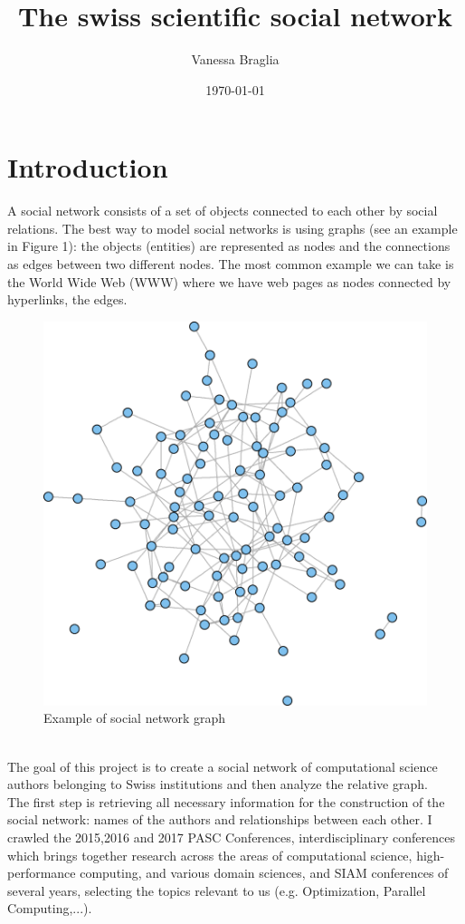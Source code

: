 \documentclass[12 pt]{article}
\author{Vanessa Braglia}
\title{The swiss scientific social network}
\date{\today}
\begin{document}
\selectfont
\maketitle 
\newpage
\tableofcontents
\newpage
\section{Introduction}
A social network consists of a set of objects connected to each other by social relations. The best way to model social networks is using graphs (see an example in Figure 1): the objects (entities) are represented as nodes and the connections as edges between two different nodes. The most common example we can take is the World Wide Web (WWW) where we have web pages as nodes connected by hyperlinks, the edges.\\
\begin{figure} [h!]
\centering 
\includegraphics[scale=0.5]{./img/graph.png}
\caption{Example of social network graph}
\end{figure}
\\
The goal of this project is to create a social network of computational science authors belonging to Swiss institutions and then analyze the relative graph.\\
The first step is retrieving all necessary information for the construction of the social network: names of the authors and relationships between each other. I crawled the 2015,2016 and 2017 PASC Conferences, interdisciplinary conferences which brings together research across the areas of computational science, high-performance computing, and various domain sciences, and SIAM conferences of several years, selecting the topics relevant to us (e.g. Optimization, Parallel Computing,...). \\
\end{document}
